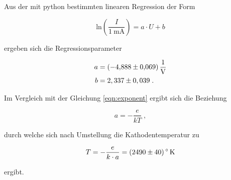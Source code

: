 Aus der mit python bestimmten linearen Regression der Form 

\begin{equation*}
    \text{ln} \left(\frac{I}{\SI{1}{\milli\ampere}} \right) 
    = a \cdot U + b
\end{equation*}

ergeben sich die Regressionsparameter 

\begin{align*}
    a &= \SI{-4.888 +- 0.069}{\per\volt}\\
    b &= 2,337 \pm 0,039 \; .
\end{align*}

Im Vergleich mit der Gleichung \eqref{eqn:exponent} ergibt sich die Beziehung

\begin{equation*}
      a = - \frac{e}{kT} \; ,
\end{equation*}

durch welche sich nach Umstellung die Kathodentemperatur zu

\begin{equation}
      T = - \frac{e}{k \cdot a} = \SI{2490 +- 40}{\degree\kelvin}
\end{equation}

ergibt.


